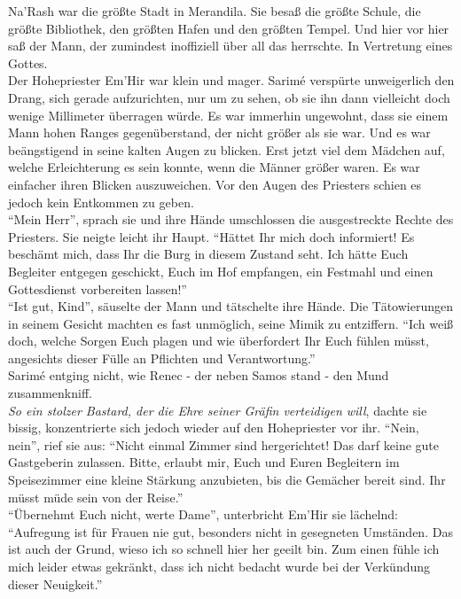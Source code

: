 Na'Rash war die größte Stadt in Merandila. Sie besaß die größte Schule, die größte Bibliothek, den 
größten Hafen und den größten Tempel. Und hier vor hier saß der Mann, der zumindest inoffiziell 
über all das herrschte. In Vertretung eines Gottes. \\
Der Hohepriester Em'Hir war klein und mager. Sarimé verspürte unweigerlich den Drang, sich gerade 
aufzurichten, nur um zu sehen, ob sie ihn dann vielleicht doch wenige Millimeter überragen würde. 
Es war immerhin ungewohnt, dass sie einem Mann hohen Ranges gegenüberstand, der nicht größer
als sie war. Und es war beängstigend in seine kalten Augen zu blicken. Erst jetzt viel dem 
Mädchen auf, welche Erleichterung es sein konnte, wenn die Männer größer waren. Es war 
einfacher ihren Blicken auszuweichen. Vor den Augen des Priesters schien es jedoch kein Entkommen zu 
geben.\\
``Mein Herr'', sprach sie und ihre Hände umschlossen die ausgestreckte Rechte des Priesters. Sie 
neigte leicht ihr Haupt. ``Hättet Ihr mich doch informiert! Es beschämt mich, dass Ihr die Burg in 
diesem Zustand seht. Ich hätte Euch Begleiter entgegen geschickt, Euch im Hof empfangen, ein 
Festmahl und einen Gottesdienst vorbereiten lassen!''\\
``Ist gut, Kind'', säuselte der Mann und tätschelte ihre Hände. Die Tätowierungen in seinem Gesicht 
machten es fast unmöglich, seine Mimik zu entziffern. ``Ich weiß doch, welche Sorgen Euch plagen 
und wie überfordert Ihr Euch fühlen müsst, angesichts dieser Fülle an Pflichten und 
Verantwortung.''\\
Sarimé entging nicht, wie Renec - der neben Samos stand - den Mund zusammenkniff. \\
\textit{So ein stolzer Bastard, der die Ehre seiner Gräfin verteidigen will}, dachte sie bissig, 
konzentrierte sich jedoch wieder auf den Hohepriester vor ihr. ``Nein, nein'', rief sie aus: 
``Nicht einmal Zimmer sind hergerichtet! Das darf keine gute Gastgeberin zulassen. Bitte, erlaubt 
mir, Euch und Euren Begleitern im Speisezimmer eine kleine Stärkung anzubieten, bis die Gemächer 
bereit sind. Ihr müsst müde sein von der Reise.''\\
``Übernehmt Euch nicht, werte Dame'', unterbricht Em'Hir sie lächelnd: ``Aufregung ist für Frauen 
nie gut, besonders nicht in gesegneten Umständen. Das ist auch der Grund, wieso ich so schnell 
hier her geeilt bin. Zum einen fühle ich mich leider etwas gekränkt, dass ich nicht bedacht wurde 
bei der Verkündung dieser Neuigkeit.''\\
